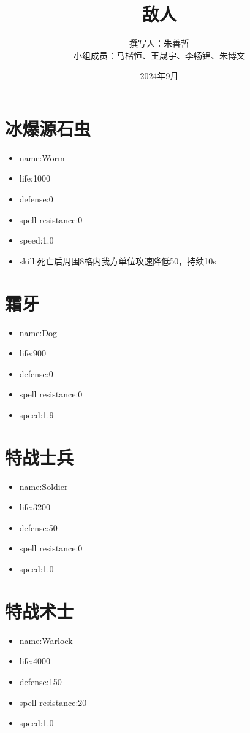 \documentclass[a4paper,12pt]{article}
\begin{document}
	\title{敌人}
	\author{撰写人：朱善哲\\小组成员：马楷恒、王晟宇、李畅锦、朱博文}
	\date{2024年9月}
	\maketitle
	\section{冰爆源石虫}
		\begin{itemize}
			\item name:Worm
			\item life:1000
			\item defense:0
			\item spell resistance:0
			\item speed:1.0	
			\item skill:死亡后周围8格内我方单位攻速降低50，持续10s
		\end{itemize}
	\section{霜牙}
		\begin{itemize}
			\item name:Dog
			\item life:900
			\item defense:0
			\item spell resistance:0
			\item speed:1.9	
		\end{itemize}
	\section{特战士兵}
		\begin{itemize}
			\item name:Soldier
			\item life:3200
			\item defense:50
			\item spell resistance:0
			\item speed:1.0
		\end{itemize}
	\section{特战术士}
		\begin{itemize}
			\item name:Warlock
			\item life:4000
			\item defense:150
			\item spell resistance:20
			\item speed:1.0
		\end{itemize}
\end{document}

